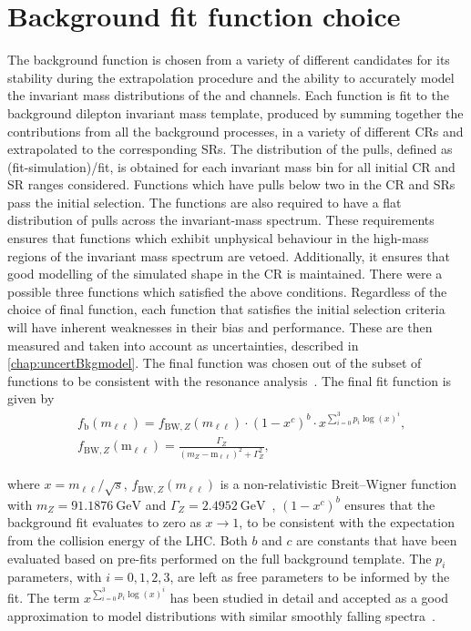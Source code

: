 \section{Background fit function choice}\label{sec:modelchoice}
The background function is chosen from a variety of different candidates for its stability during the extrapolation procedure and the ability to accurately model the invariant mass distributions of the \ee and \mumu channels. Each function is fit to the background dilepton invariant mass template, produced by summing together the contributions from all the background processes, in a variety of different CRs and extrapolated to the corresponding SRs. The distribution of the pulls, defined as (fit-simulation)/fit, is obtained for each invariant mass bin for all initial CR and SR ranges considered. Functions which have pulls below two in the CR and SRs pass the initial selection. The functions are also required to have a flat distribution of pulls across the invariant-mass spectrum. These requirements ensures that functions which exhibit unphysical behaviour in the high-mass regions of the invariant mass spectrum are vetoed. Additionally, it ensures that good modelling of the simulated shape in the CR is maintained. There were a possible three functions which satisfied the above conditions. Regardless of the choice of final function, each function that satisfies the initial selection criteria will have inherent weaknesses in their bias and performance. These are then measured and taken into account as uncertainties, described in \cref{chap:uncertBkgmodel}. The final function was chosen out of the subset of functions to be consistent with the resonance analysis~\cite{Aad:2019fac}. The final fit function is given by
\begin{equation}
    \label{eq:fitfunc}
    \begin{aligned}
        & f_\textrm{b}(m_{\ell\ell}) = f_{\mathrm{BW},Z}(m_{\ell\ell}) \cdot \left(1 - x^{c}\right)^{b} \cdot x^{\sum_{i=0}^3 p_i\log(x)^i}, \\
        & f_{\mathrm{BW},Z}(\mathrm{m_{\ell\ell}}) = \frac{\Gamma_Z}{(m_Z - \mathrm{m_{\ell\ell}})^2 + \Gamma_Z^2},
    \end{aligned}
\end{equation}

where $x = m_{\ell\ell}/\sqrt{s}$, $f_{\mathrm{BW},Z}(m_{\ell\ell})$ is a non-relativistic Breit--Wigner function with $m_Z = \SI{91.1876}{\giga\electronvolt}$ and $\Gamma_Z = \SI{2.4952}{\giga\electronvolt}$~\cite{PhysRevD.98.030001}, $(1 - x^{c})^b$ ensures that the background fit evaluates to zero as $x \to 1$, to be consistent with the expectation from the collision energy of the LHC. Both $b$ and $c$ are constants that have been evaluated based on pre-fits performed on the full background template. The $p_i$ parameters, with $i = 0,1,2,3$, are left as free parameters to be informed by the fit. The term $x^{\sum_{i=0}^3 p_i\log(x)^i}$ has been studied in detail and accepted as a good approximation to model distributions with similar smoothly falling spectra~\cite{Aad:2019fac,Aaboud:2016tru,Aaboud:2017yyg}.

